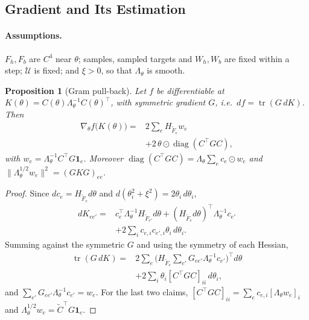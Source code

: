\documentclass[11pt]{article}
\newtheorem{proposition}{Proposition}
\newcommand{\U}{\mathcal{U}}
\newcommand{\Lam}{\Lambda_{\theta}}
\newcommand{\Ft}{\widetilde{F}}
\newcommand{\tr}{\operatorname{tr}}
\begin{document}
\subsection{Gradient and Its Estimation}
\label{app:outer}

\paragraph{Assumptions.} $F_h,F_b$ are $C^4$ near $\theta$; samples, sampled targets and $W_h,W_b$ are fixed within a step; $\U$ is fixed; and $\xi>0$, so that $\Lam$ is smooth.

\begin{proposition}[Gram pull-back]
\label{prop:gram}
Let $f$ be differentiable at $K(\theta)=C(\theta)\Lam^{-1}C(\theta)^\top$, with symmetric gradient $G$, i.e.\ $df=\tr(G\,dK)$. Then
\begin{equation*}
\begin{aligned}
\nabla_\theta f\bigl(K(\theta)\bigr)={}&2\textstyle\sum_eH_{\Ft_e}w_e\\
&+2\,\theta\odot\operatorname{diag}(C^\top GC),
\end{aligned}
\end{equation*}
with $w_e=\Lam^{-1}C^\top G\mathbf 1_e$. Moreover $\operatorname{diag}(C^\top GC)=\Lam\sum_ec_e\odot w_e$ and $\|\Lam^{1/2}w_e\|^2=(GKG)_{ee}$.
\end{proposition}
\begin{proof}
Since $dc_e=H_{\Ft_e}d\theta$ and $d(\theta_i^2+\xi^2)=2\theta_i\,d\theta_i$,
\begin{equation*}
\begin{aligned}
dK_{ee'}={}&c_e^\top\Lam^{-1}H_{\Ft_{e'}}d\theta+(H_{\Ft_e}d\theta)^\top\Lam^{-1}c_{e'}\\
&+2\textstyle\sum_ic_{e,i}c_{e',i}\theta_i\,d\theta_i .
\end{aligned}
\end{equation*}
Summing against the symmetric $G$ and using the symmetry of each Hessian,
\begin{equation*}
\begin{aligned}
\tr(G\,dK)={}&2\textstyle\sum_{e}\bigl(H_{\Ft_e}\sum_{e'}G_{ee'}\Lam^{-1}c_{e'}\bigr)^\top d\theta\\
&+2\textstyle\sum_i\theta_i[C^\top GC]_{ii}\,d\theta_i ,
\end{aligned}
\end{equation*}
and $\sum_{e'}G_{ee'}\Lam^{-1}c_{e'}=w_e$. For the last two claims, $[C^\top GC]_{ii}=\sum_ec_{e,i}[\Lam w_e]_i$ and $\Lam^{1/2}w_e=\widetilde C^\top G\mathbf 1_e$.
\end{proof}
\end{document}
